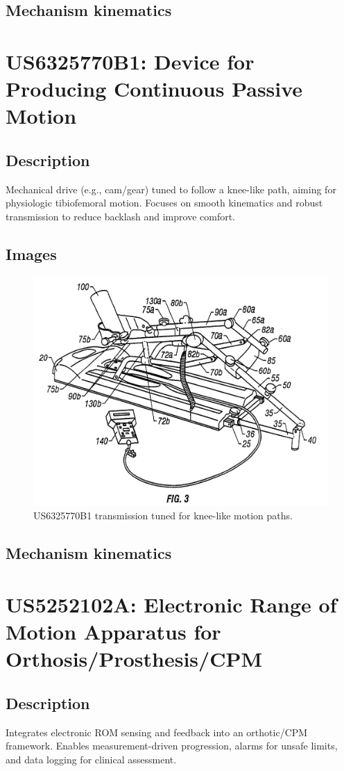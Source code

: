 \documentclass[11pt]{article}
\begin{document}
\subsection{Mechanism kinematics}

\section{US6325770B1: Device for Producing Continuous Passive Motion}
\subsection{Description}
Mechanical drive (e.g., cam/gear) tuned to follow a knee-like path, aiming for physiologic tibiofemoral motion. Focuses on smooth kinematics and robust transmission to reduce backlash and improve comfort.
\subsection{Images}
\begin{figure}[H]
  \centering
  \includegraphics[width=0.54\linewidth]{US6325770B1_1.png}
  \caption{US6325770B1 transmission tuned for knee-like motion paths.}
  \label{fig:US6325770B1}
\end{figure}

\subsection{Mechanism kinematics}

\section{US5252102A: Electronic Range of Motion Apparatus for Orthosis/Prosthesis/CPM}
\subsection{Description}
Integrates electronic ROM sensing and feedback into an orthotic/CPM framework. Enables measurement-driven progression, alarms for unsafe limits, and data logging for clinical assessment.
\end{document}
